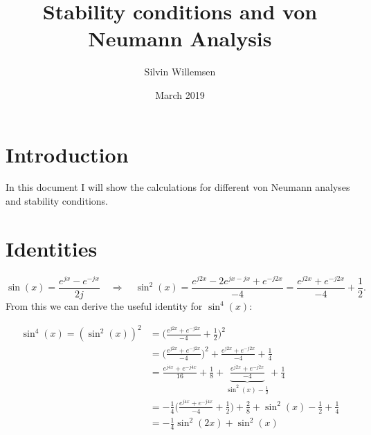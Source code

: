 \documentclass{article}
\title{Stability conditions and von Neumann Analysis}
\author{Silvin Willemsen}
\date{March 2019}
\begin{document}
\maketitle

\section{Introduction}
In this document I will show the calculations for different von Neumann analyses and stability conditions.

\section{Identities}

\begin{equation}\label{eq:sinIdentity}
    \sin(x) = \frac{e^{jx} - e^{-jx}}{2j}\quad \Longrightarrow \quad \sin^2(x) = \frac{e^{j2x} - 2e^{jx-jx}+ e^{-j2x}}{-4} = \frac{e^{j2x} + e^{-j2x}}{-4} + \frac{1}{2}.
\end{equation}
From this we can derive the useful identity for $\sin^4(x)$:

\begin{align}
    \sin^4(x) = (\sin^2(x))^2 &= \Bigg(\frac{e^{j2x} + e^{-j2x}}{-4} + \frac{1}{2}\Bigg)^2\nonumber\\
    &=\Bigg(\frac{e^{j2x} + e^{-j2x}}{-4}\Bigg)^2 + \frac{e^{j2x} + e^{-j2x}}{-4} + \frac{1}{4}\nonumber\\
    &=\frac{e^{j4x} + e^{-j4x}}{16} + \frac{1}{8} + \underbrace{\frac{e^{j2x} + e^{-j2x}}{-4}}_\text{$\sin^2(x)- \frac{1}{2}$} + \frac{1}{4}\nonumber\\
    &= -\frac{1}{4}\Bigg(\frac{e^{j4x} + e^{-j4x}}{-4} + \frac{1}{2}\Bigg) + \frac{2}{8} + \sin^2(x) - \frac{1}{2} + \frac{1}{4}\nonumber\\
    &= -\frac{1}{4}\sin^2(2x) + \sin^2(x) \label{eq:sin4}
\end{align}
\end{document}

